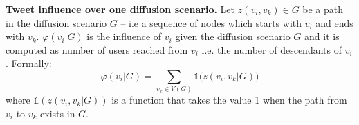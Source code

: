 \textbf{Tweet influence over one diffusion scenario.}
%
Let $z(v_i, v_k) \in G$ be a path in the diffusion scenario $G$ -- i.e a sequence of nodes which starts with $v_i$ and ends with $v_k$.
$\varphi(v_i | G)$ is the influence of $v_i$ given the diffusion scenario $G$ and it is computed as number of users reached from $v_i$ i.e. the number of descendants of $v_i$.
Formally:
%
\begin{equation}
	\varphi(v_i|G) 	=  \sum_{v_k \in V(G)} \mathds{1} \big(z(v_i,v_k | G) ) \label{eq:infl-in-a-scenario}
\end{equation}
where $\mathds{1} \left( z(v_i,v_k|G) \right)$ is a function that takes the value 1 when the path from $v_i$ to $v_k$ exists in $G$.

